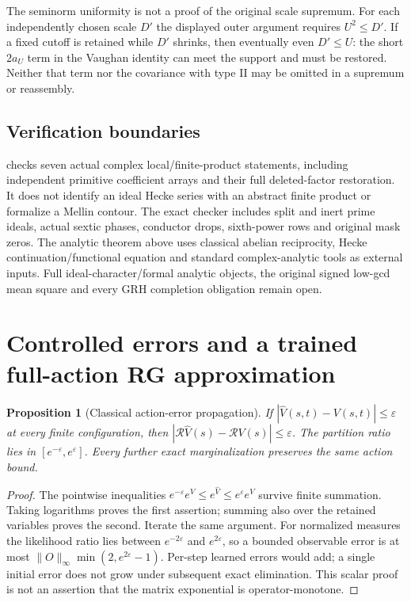 \documentclass[11pt]{article}
\newtheorem{proposition}[theorem]{Proposition}
\theoremstyle{definition}\newtheorem{definition}[theorem]{Definition}
\theoremstyle{remark}\newtheorem{remark}[theorem]{Remark}
\begin{document}
The seminorm uniformity is not a proof of the original scale supremum.
For each independently chosen scale $D'$ the displayed outer argument
requires $U^2\le D'$. If a fixed cutoff is retained while $D'$ shrinks,
then eventually even $D'\le U$: the short $2a_U$ term in the Vaughan
identity can meet the support and must be restored. Neither that term nor
the covariance with type II may be omitted in a supremum or reassembly.

\subsection{Verification boundaries}
 checks seven actual complex local/finite-product
statements, including independent primitive coefficient arrays and their
full deleted-factor restoration. It does not identify an ideal Hecke
series with an abstract finite product or formalize a Mellin contour.
The exact checker includes split and inert prime ideals, actual sextic
phases, conductor drops, sixth-power rows and original mask zeros.
The analytic theorem above uses classical abelian reciprocity, Hecke
continuation/functional equation and standard complex-analytic tools as
external inputs. Full ideal-character/formal analytic objects, the original
signed low-gcd mean square and every GRH completion obligation remain open.

\section{Controlled errors and a trained full-action RG approximation}
\label{sec:rg-details}
\begin{proposition}[Classical action-error propagation]
If $|\widehat V(s,t)-V(s,t)|\le\varepsilon $ at every finite configuration,
then $|\mathcal R\widehat V(s)-\mathcal RV(s)|\le\varepsilon $.
The partition ratio lies in $[e^{-\varepsilon},e^{\varepsilon}]$.
Every further \emph{exact} marginalization preserves the same action bound.
\end{proposition}
\begin{proof}
The pointwise inequalities
$ e^{-\varepsilon}e^V\le e^{\widehat V}\le e^\varepsilon e^V $
survive finite summation. Taking logarithms proves the first assertion;
summing also over the retained variables proves the second. Iterate the
same argument. For normalized measures the likelihood ratio lies between
$ e^{-2\varepsilon}$ and $ e^{2\varepsilon}$, so a bounded observable error
is at most $\|O\|_\infty\min(2,e^{2\varepsilon}-1)$. Per-step learned
errors would add; a single initial error does not grow under subsequent
exact elimination. This scalar proof is not an assertion that the matrix
exponential is operator-monotone.
\end{proof}
\end{document}
